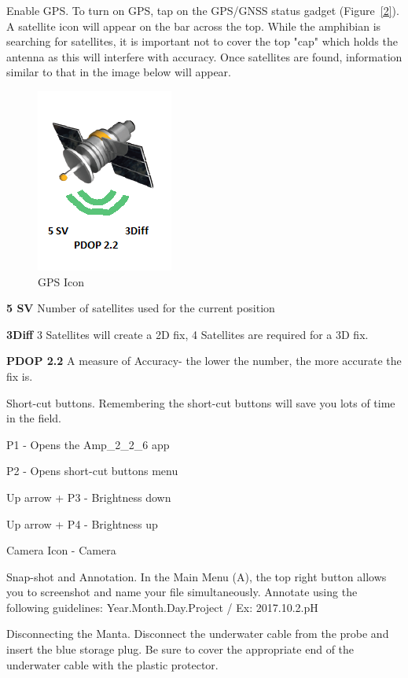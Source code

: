 \documentclass[12pt]{../SOP3}\usepackage[]{graphicx}\usepackage[]{color}
\begin{document}
\NP Enable GPS. To turn on GPS, tap on the GPS/GNSS status gadget (Figure~\ref{2}). A satellite icon will appear on the bar across the top. While the amphibian is searching for satellites, it is important not to cover the top "cap" which holds the antenna as this will interfere with accuracy. Once satellites are found, information similar to that in the image below will appear.

\begin{figure}[h]
\centering
\includegraphics{GPS.png}
\caption{GPS Icon}
\label{GPS.png}
\end{figure}

\textbf{5 SV} Number of satellites used for the current position

\textbf{3Diff} 3 Satellites will create a 2D fix, 4 Satellites are required for a 3D fix.

\textbf{PDOP 2.2} A measure of Accuracy- the lower the number, the more accurate the fix is.

\NP Short-cut buttons. Remembering the short-cut buttons will save you lots of time in the field. 

{P1} - Opens the Amp\_2\_2\_6 app

{P2} - Opens short-cut buttons menu

{Up arrow + P3} - Brightness down

{Up arrow + P4} - Brightness up

{Camera Icon} - Camera

\NP Snap-shot and Annotation. In the Main Menu (A), the top right button allows you to screenshot and name your file simultaneously. Annotate using the following guidelines: Year.Month.Day.Project / Ex: 2017.10.2.pH

\NP Disconnecting the Manta. Disconnect the underwater cable from the probe and insert the blue storage plug. Be sure to cover the appropriate end of the underwater cable with the plastic protector. 
\end{document}
